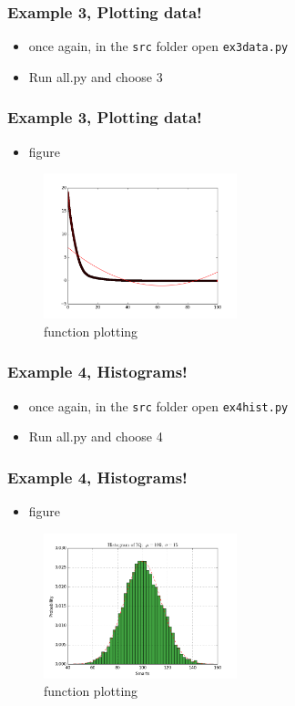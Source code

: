 \documentclass{beamer}
\begin{document}
\begin{frame}
\frametitle{Example 3, Plotting data!}
\begin{itemize}
	\item once again, in the \texttt{src} folder open \texttt{ex3data.py}
	\item Run all.py and choose 3 
\end{itemize}
\end{frame}

\begin{frame}
\frametitle{Example 3, Plotting data!}
\begin{itemize}
	\item figure 
\end{itemize}
\begin{figure}
	\centering
	\includegraphics[width=0.5\textwidth]{ex3.png}
	\caption{function plotting}
	\label{fig:function}
\end{figure}
\end{frame}

\begin{frame}
\frametitle{Example 4, Histograms!}
\begin{itemize}
\item once again, in the \texttt{src} folder open \texttt{ex4hist.py}
	\item Run all.py and choose 4 
\end{itemize}
\end{frame}

\begin{frame}
\frametitle{Example 4, Histograms!}
\begin{itemize}
\item figure
\end{itemize}
\begin{figure}
	\centering
	\includegraphics[width=0.5\textwidth]{ex4.png}
	\caption{function plotting}
	\label{fig:function}
\end{figure}
\end{frame}
\end{document}
